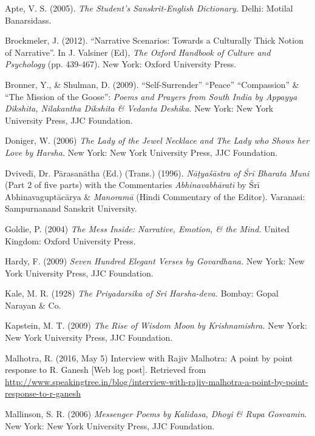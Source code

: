 \begin{thebibliography}{99}
\itemsep=2pt
Apte, V. S. (2005). \textsl{The Student’s Sanskrit-English Dictionary.} Delhi: Motilal Banarsidass.

Brockmeler, J. (2012). “Narrative Scenarios: Towards a Culturally Thick Notion of Narrative”. In J. Valsiner (Ed), \textsl{The Oxford Handbook of Culture and Psychology} (pp. 439-467). New York: Oxford University Press.

Bronner, Y., \& Shulman, D. (2009). “Self-Surrender” “Peace” “Compassion” \& “The Mission of the Goose”: \textsl{Poems and Prayers from South India by Appayya Dikshita, Nilakantha Dikshita \& Vedanta Deshika.} New York: New York University Press, JJC Foundation.

Doniger, W. (2006) \textsl{The Lady of the Jewel Necklace and The Lady who Shows her Love by Harsha.} New York: New York University Press, JJC Foundation.

Dvivedī, Dr. Pārasanātha (Ed.) (Trans.) (1996). \textsl{Nāṭyaśāstra of Śrī Bharata Muni} (Part 2 of five parts) with the Commentaries  \textsl{Abhinavabhāratī} by Śrī Abhinavaguptācārya \& \textsl{Manoramā} (Hindi Commentary of the Editor). Varanasi: Sampurnanand Sanskrit University.

Goldie, P. (2004) \textsl{The Mess Inside: Narrative, Emotion, \& the Mind.} United Kingdom: Oxford University Press.

Hardy, F. (2009) \textsl{Seven Hundred Elegant Verses by Govardhana.} New York: New York University Press, JJC Foundation.

Kale, M. R. (1928) \textsl{The Priyadarsika of Sri Harsha-deva.} Bombay: Gopal Narayan \& Co.

Kapstein, M. T. (2009) \textsl{The Rise of Wisdom Moon by Krishnamishra.} New York: New York University Press, JJC Foundation.

Malhotra, R. (2016, May 5) Interview with Rajiv Malhotra: A point by point response to R. Ganesh [Web log post]. Retrieved from   \url{http://www.speakingtree.in/blog/interview-with-rajiv-malhotra-a-point-by-point-response-to-r-ganesh}

Mallinson, S. R. (2006) \textsl{Messenger Poems by Kalidasa, Dhoyi \& Rupa Gosvamin}. New York: New York University Press, JJC Foundation.


\end{thebibliography}
